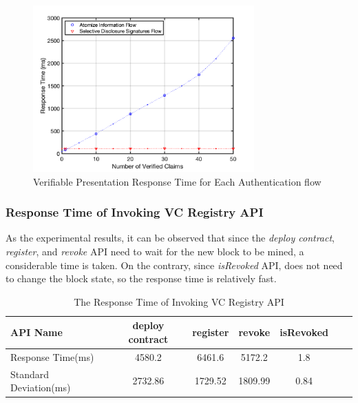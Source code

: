 \documentclass[conference, dvipdfmx]{IEEEtran} %
\begin{document}
\begin{sloppypar}
\begin{figure}[ht] %
  \begin{center} %
  \includegraphics[width=85mm]{images/new_verification_time.png} %
  \caption{Verifiable Presentation Response Time for Each Authentication flow} %
  \label{fig:new_verification_time} %
  \end{center}
\end{figure}

\subsubsection{Response Time of Invoking VC Registry API}

As the experimental results, it can be observed that since the \textit{deploy contract}, \textit{register}, and \textit{revoke} API need to wait for the new block to be mined, a considerable time is taken. On the contrary, since \textit{isRevoked} API, does not need to change the block state, so the response time is relatively fast.

	\begin{table}[ht]
		\begin{center}
		\caption{The Response Time of Invoking VC Registry API}
		\label{table:VC_contract_Response_Time}
		\begin{tabular}{p{2cm} cccccc}
		\hline
		API Name & deploy contract & register & revoke & isRevoked \\ \hline\hline
		Response Time(ms) & 4580.2 & 6461.6 & 5172.2 & 1.8 \\ \hline
		Standard Deviation(ms) & 2732.86  & 1729.52  & 1809.99  & 0.84 \\ \hline
		\end{tabular}
		\end{center}
	\end{table}


\end{sloppypar}
\end{document}
